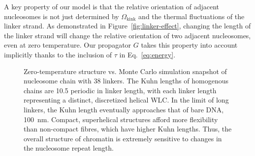 \documentclass[%
 reprint,
superscriptaddress,
showpacs,preprintnumbers,
 amsmath,amssymb,
 aps,
 prl,
]{revtex4-1}
\begin{document}
A key property of our model is that the relative orientation of adjacent
    nucleosomes is not just determined by $\Omega_\text{kink}$ and the thermal
    fluctuations of the linker strand.
As demonstrated in Figure~\ref{fig:linker-effect}, changing the length of the
    linker strand will change the relative orientation of two adjacent
    nucleosomes, even at zero temperature.
Our propagator $G$ takes this property into account implicitly thanks to the
    inclusion of $\tau$ in Eq.~\ref{eq:energy}.

\begin{figure}[th]
    \begin{centering}
    \end{centering}
    \caption{\protect{} Zero-temperature structure vs.
    Monte Carlo simulation snapshot of nucleosome chain with \SI{38}{\basepair}
    linkers.  \protect{} The Kuhn lengths of homogenous
    chains are \SI{10.5}{\basepair} periodic in linker length, with each linker
    length representing a distinct, discretized helical WLC\@. In the limit of
    long linkers, the Kuhn length eventually approaches that of bare DNA,
    \SI{100}{\nano\metre}. \protect{} Compact,
    superhelical structures afford more flexibility than non-compact fibres,
    which have higher Kuhn lengths. Thus, the overall structure of chromatin is
    extremely sensitive to changes in the nucleosome repeat
    length.}\label{fig:homo-kuhn}
\end{figure}
\end{document}
